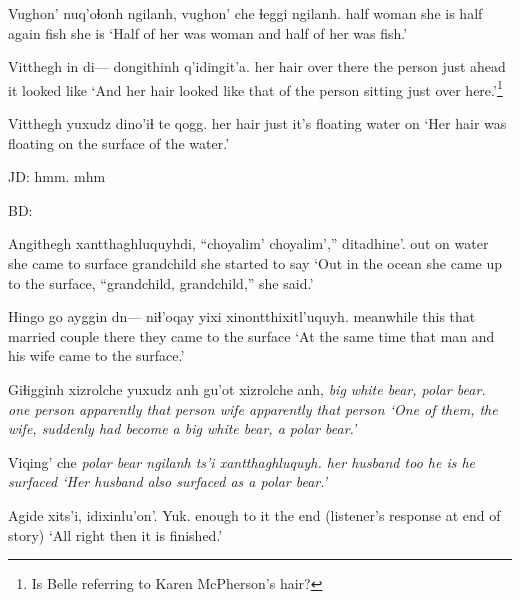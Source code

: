 \documentclass[12pt]{article}
\begin{document}
\gll Vughon' nuq'oɬonh ngilanh, vughon' che ɬeggi ngilanh.
half woman {she is} half again fish {she is}
\glt `Half of her was woman and half of her was fish.' 
\glend

\gll Vitthegh in di--- dongithinh q'idingit'a. 
{her hair} {over there} {} {the person just ahead} {it looked like} 
\glt `And her hair looked like that of the person sitting just over here.'\footnote{Is Belle referring to Karen McPherson's hair?} 
\glend

\gll Vitthegh yuxudz dino'iɬ te qogg. 
{her hair} just {it's floating} water on
\glt `Her hair was floating on the surface of the water.'
\glend

JD:  hmm. mhm

BD:

\gll Angithegh xantthaghluquyhdi, ``choyalim' choyalim','' ditadhine'. 
{out on water} {she came to surface} grandchild {} {she started to say}
\glt `Out in the ocean she came up to the surface, ``grandchild, grandchild,'' she said.' 
\glend

\gll Hingo go ayggin dn--- niɬ'oqay yixi xinontthixitl'uquyh. 
meanwhile this that {} {married couple} there {they came to the surface}
\glt `At the same time that man and his wife came to the surface.' 
\glend

\gll Giɬigginh xizrolche yuxudz anh gu'ot xizrolche anh, \em {big white bear, polar bear.}
{one person} apparently {} {that person} {wife} apparently {that person}
\glt `One of them, the wife, suddenly had become a big white bear, a polar bear.' 
\glend

\gll Viqing' che \em {polar bear} ngilanh ts'i xantthaghluquyh. 
{her husband} too {} {he is} {} {he surfaced}
\glt `Her husband also surfaced as a polar bear.' 
\glend

\gll Agide xits'i, idixinlu'on'.  Yuk.
enough {to it} {the end} {(listener's response at end of story)}
\glt `All right then it is finished.' 
\glend
\end{document}
